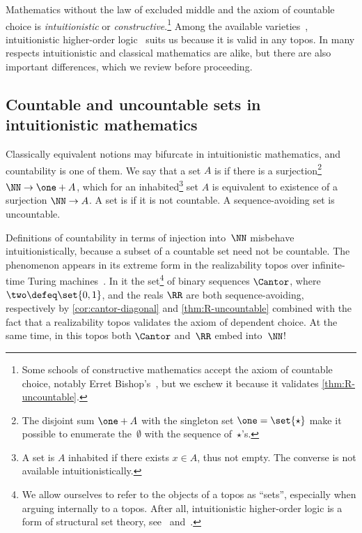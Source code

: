 Mathematics without the law of excluded middle and the axiom of countable choice is \emph{intuitionistic} or \emph{constructive}.\footnote{Some schools of constructive mathematics accept the axiom of countable choice, notably Erret Bishop's~\cite{bishop67:_found_const_analy}, but we eschew it because it validates \cref{thm:R-uncountable}.} Among the available varieties~\cite{bridges87:_variet_const_mathem},
intuitionistic higher-order logic~\cite{jim86:_introd_higher_order_categ_logic} suits us because it is valid in any topos.
%
In many respects intuitionistic and classical mathematics are alike, but there are also important differences, which we review before proceeding.

\subsection{Countable and uncountable sets in intuitionistic mathematics}
\label{sec:countabe-set-intuit}

Classically equivalent notions may bifurcate in intuitionistic mathematics, and countability is one of them.
We say that a set $A$ is  if there is a surjection\footnote{The disjoint sum $\one + A$ with the singleton set $\one = \set{\star}$ make it possible to enumerate the~$\emptyset$ with the sequence of~$\star$'s.} $\NN \to \one + A$, which for an inhabited\footnote{A set is $A$ inhabited if there exists $x \in A$, thus not empty. The converse is not available intuitionistically.} set $A$ is equivalent to existence of a surjection $\NN \to A$. A set is  if it is not countable. A sequence-avoiding set is uncountable.

Definitions of countability in terms of injection into~$\NN$ misbehave intuitionistically,
because a subset of a countable set need not be countable. The phenomenon appears in its extreme form in the
realizability topos over infinite-time Turing machines~\cite{bauer15:_baire}. In it the set\footnote{We allow ourselves to refer to the objects of a topos as ``sets'', especially when arguing internally to a topos. After all,  intuitionistic higher-order logic is a form of structural set theory, see~\cite[Sect.~2.2]{taylor99:_pract_found_mathem} and~\cite{lawvere03:_sets_mathem}.} of binary sequences $\Cantor$, where $\two \defeq \set{0,1}$, and the reals $\RR$ are both sequence-avoiding, respectively by \cref{cor:cantor-diagonal} and \cref{thm:R-uncountable} combined with the fact that a realizability topos validates the axiom of dependent choice.
At the same time, in this topos both $\Cantor$ and~$\RR$ embed into~$\NN$!

